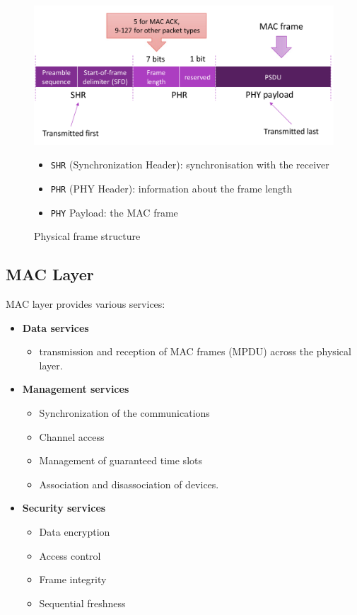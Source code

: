 \begin{figure}[htbp]
   \centering
   \includegraphics{images/802_physicalframe.png}
   \caption{Physical frame structure}
   \label{fig:802_physicalframe}

   \begin{itemize}
      \item \texttt{SHR} (Synchronization Header): synchronisation with the receiver
      \item \texttt{PHR} (PHY Header): information about the frame length
      \item \texttt{PHY} Payload: the MAC frame
   \end{itemize}
\end{figure}
   
\subsection{MAC Layer}

MAC layer provides various services:
\begin{itemize}
   \item \textbf{Data services}
   \begin{itemize}
      \item transmission and reception of MAC frames (MPDU)
      across the physical layer.
   \end{itemize}
   \item \textbf{Management services}
   \begin{itemize}
      \item Synchronization of the communications
      \item Channel access
      \item Management of guaranteed time slots
      \item Association and disassociation of devices.
   \end{itemize}
   \item \textbf{Security services}
   \begin{itemize}
      \item Data encryption
      \item Access control
      \item Frame integrity
      \item Sequential freshness
   \end{itemize}
\end{itemize}

